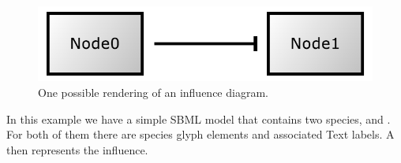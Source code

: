 \begin{center}
\begin{figure}[h!]
\includegraphics{figures/GeneralGlyphExample}
\caption{One possible rendering of an influence diagram.}
\end{figure}
\end{center}

In this example we have a simple SBML model that contains two species, 
 and . For both of them there are species glyph
elements and associated Text labels. A \GeneralGlyph then represents the
influence. 


